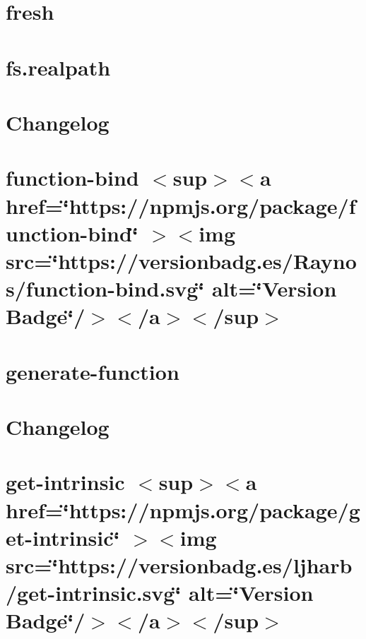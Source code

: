 \documentclass[twoside]{book}
\newcommand{\+}{\discretionary{\mbox{\scriptsize$\hookleftarrow$}}{}{}}
\begin{document}
\chapter{fresh}
\label{md_src_nodejs_node_modules_fresh_README}

\chapter{fs.\+realpath}
\label{md_src_nodejs_node_modules_fs_realpath_README}

\chapter{Changelog}
\label{md_src_nodejs_node_modules_function_bind_CHANGELOG}

\chapter{function-\/bind \texorpdfstring{$<$}{<}sup\texorpdfstring{$>$}{>}\texorpdfstring{$<$}{<}a href=\char`\"{}https\+://npmjs.\+org/package/function-\/bind\char`\"{} \texorpdfstring{$>$}{>}\texorpdfstring{$<$}{<}img src=\char`\"{}https\+://versionbadg.\+es/\+Raynos/function-\/bind.\+svg\char`\"{} alt=\char`\"{}\+Version Badge\char`\"{}/\texorpdfstring{$>$}{>}\texorpdfstring{$<$}{<}/a\texorpdfstring{$>$}{>}\texorpdfstring{$<$}{<}/sup\texorpdfstring{$>$}{>}}
\label{md_src_nodejs_node_modules_function_bind_README}

\chapter{generate-\/function}
\label{md_src_nodejs_node_modules_generate_function_README}

\chapter{Changelog}
\label{md_src_nodejs_node_modules_get_intrinsic_CHANGELOG}

\chapter{get-\/intrinsic \texorpdfstring{$<$}{<}sup\texorpdfstring{$>$}{>}\texorpdfstring{$<$}{<}a href=\char`\"{}https\+://npmjs.\+org/package/get-\/intrinsic\char`\"{} \texorpdfstring{$>$}{>}\texorpdfstring{$<$}{<}img src=\char`\"{}https\+://versionbadg.\+es/ljharb/get-\/intrinsic.\+svg\char`\"{} alt=\char`\"{}\+Version Badge\char`\"{}/\texorpdfstring{$>$}{>}\texorpdfstring{$<$}{<}/a\texorpdfstring{$>$}{>}\texorpdfstring{$<$}{<}/sup\texorpdfstring{$>$}{>}}
\label{md_src_nodejs_node_modules_get_intrinsic_README}

\end{document}
